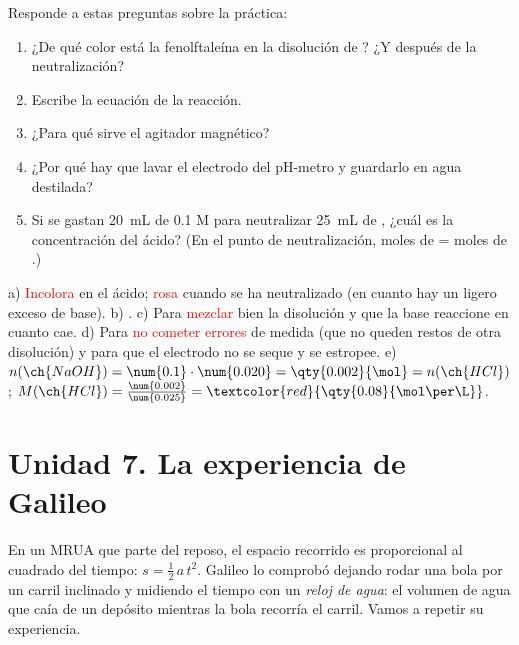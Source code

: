 \begin{exercise}
    Responde a estas preguntas sobre la práctica:
    \begin{enumerate}[label=\alph*)]
        \item ¿De qué color está la fenolftaleína en la disolución de ? ¿Y después de la neutralización?
        \item Escribe la ecuación de la reacción.
        \item ¿Para qué sirve el agitador magnético?
        \item ¿Por qué hay que lavar el electrodo del pH-metro y guardarlo en agua destilada?
        \item Si se gastan \qty{20}{\mL} de  \num{0.1} M para neutralizar \qty{25}{\mL} de , ¿cuál es la concentración del ácido? (En el punto de neutralización, moles de  = moles de .)
    \end{enumerate}
    \begin{solu}
        a) \textcolor{red}{Incolora} en el ácido; \textcolor{red}{rosa} cuando se ha neutralizado (en cuanto hay un ligero exceso de base).
        b) .
        c) Para \textcolor{red}{mezclar} bien la disolución y que la base reaccione en cuanto cae.
        d) Para \textcolor{red}{no cometer errores} de medida (que no queden restos de otra disolución) y para que el electrodo no se seque y se estropee.
        e) \(n(\ch{NaOH}) = \num{0.1} \cdot \num{0.020} = \qty{0.002}{\mol} = n(\ch{HCl})\); \(M(\ch{HCl}) = \frac{\num{0.002}}{\num{0.025}} = \textcolor{red}{\qty{0.08}{\mol\per\L}}\).
    \end{solu}
\end{exercise}

\section{Unidad 7. La experiencia de Galileo}

En un MRUA que parte del reposo, el espacio recorrido es proporcional al cuadrado del tiempo: \(s = \frac{1}{2}\, a\, t^2\). Galileo lo comprobó dejando rodar una bola por un carril inclinado y midiendo el tiempo con un \emph{reloj de agua}: el volumen de agua que caía de un depósito mientras la bola recorría el carril. Vamos a repetir su experiencia.

